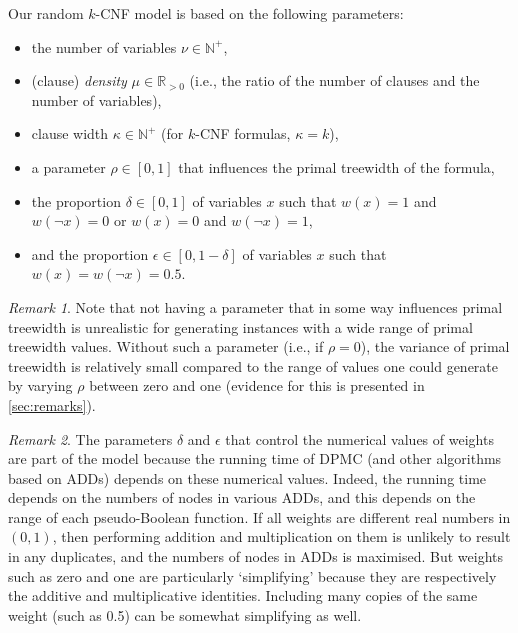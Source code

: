\documentclass{article}
\theoremstyle{definition}
\theoremstyle{remark}
\newtheorem*{remark}{Remark}
\begin{document}
Our random $k$-CNF model is based on the following parameters:
\begin{itemize}
\item the number of variables $\nu \in \mathbb{N}^+$,
\item (clause) \emph{density} $\mu \in \mathbb{R}_{>0}$ (i.e., the ratio of
  the number of clauses and the number of variables),
\item clause width $\kappa \in \mathbb{N}^+$ (for $k$-CNF formulas, $\kappa =
  k$),
\item a parameter $\rho \in [0, 1]$ that influences the primal treewidth of
  the formula,
\item the proportion $\delta \in [0, 1]$ of variables $x$ such that $w(x) = 1$
  and $w(\neg x) = 0$ or $w(x) = 0$ and $w(\neg x) = 1$,
\item and the proportion $\epsilon \in [0, 1-\delta]$ of variables $x$ such that
  $w(x) = w(\neg x) = 0.5$.
\end{itemize}

\begin{remark}
  Note that not having a parameter that in some way influences primal treewidth
  is unrealistic for generating instances with a wide range of primal treewidth
  values. Without such a parameter (i.e., if $\rho=0$), the variance of primal
  treewidth is relatively small compared to the range of values one could
  generate by varying $\rho$ between zero and one (evidence for this is
  presented in \cref{sec:remarks}).
\end{remark}

\begin{remark}
  The parameters $\delta$ and $\epsilon$ that control the numerical values of
  weights are part of the model because the running time of \textsc{DPMC}
  \cite{DBLP:conf/cp/DudekPV20} (and other algorithms based on ADDs) depends on
  these numerical values. Indeed, the running time depends on the numbers of
  nodes in various ADDs, and this depends on the range of each pseudo-Boolean
  function. If all weights are different real numbers in $(0, 1)$, then
  performing addition and multiplication on them is unlikely to result in any
  duplicates, and the numbers of nodes in ADDs is maximised. But weights such as
  zero and one are particularly `simplifying' because they are respectively the
  additive and multiplicative identities. Including many copies of the same
  weight (such as 0.5) can be somewhat simplifying as well.
\end{remark}
\end{document}
